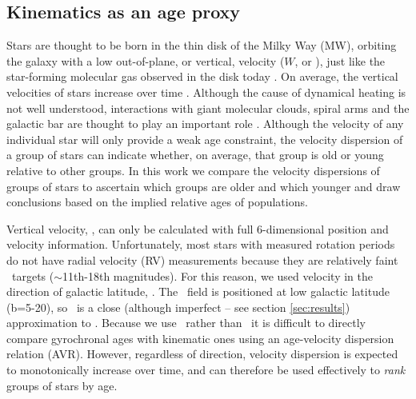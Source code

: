 \subsection{Kinematics as an age proxy}

Stars are thought to be born in the thin disk of the Milky Way (MW), orbiting
the galaxy with a low out-of-plane, or vertical, velocity ($W$, or \vz),
just like the star-forming molecular gas observed in the disk today
\citep[\eg][]{stark1989, stark2005, aumer2009, martig2014, aumer2016}.
On average, the vertical velocities of stars increase over time
\citep[\eg][]{nordstrom2004, holmberg2007, holmberg2009, aumer2009,
casagrande2011}.
Although the cause of dynamical heating is not well understood, interactions
with giant molecular clouds, spiral arms and the galactic bar are thought to
play an important role \citep[see][for a review of secular evolution in the
MW]{sellwood2014}.
Although the velocity of any individual star will only provide a weak age
constraint, the velocity dispersion of a group of stars can indicate whether,
on average, that group is old or young relative to other groups.
In this work we compare the velocity dispersions of groups of stars to
ascertain which groups are older and which younger and draw conclusions based
on the implied relative ages of populations.

Vertical velocity, \vz, can only be calculated with full 6-dimensional
position and velocity information.
Unfortunately, most stars with measured rotation periods do not have radial
velocity (RV) measurements because they are relatively faint \kepler\ targets
($\sim$11th-18th magnitudes).
For this reason, we used velocity in the direction of galactic latitude, \vb.
The \kepler\ field is positioned at low galactic latitude (b=5-20\degrees), so
\vb\ is a close (although imperfect -- see section \ref{sec:results})
approximation to \vz.
Because we use \vb\ rather than \vz\, it is difficult to directly compare
gyrochronal ages with kinematic ones using an age-velocity dispersion relation
(AVR).
However, regardless of direction, velocity dispersion is expected to
monotonically increase over time, and can therefore be used effectively to
{\it rank} groups of stars by age.

